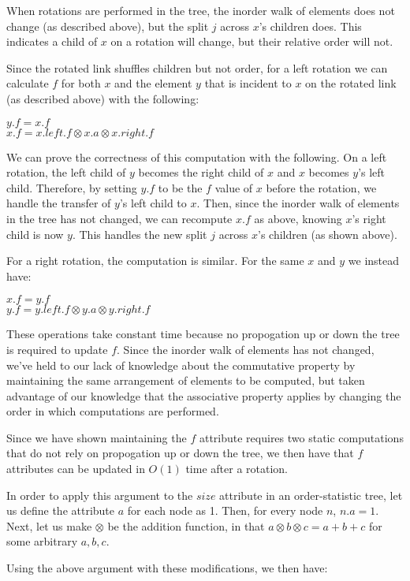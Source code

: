 \documentclass[11pt]{article}
\begin{document}
When rotations are performed in the tree, the inorder walk of elements does not change (as described above), but the split $j$ across $x$'s children does. This indicates a child of $x$ on a rotation will change, but their relative order will not.

Since the rotated link shuffles children but not order, for a left rotation we can calculate $f$ for both $x$ and the element $y$ that is incident to $x$ on the rotated link (as described above) with the following:

$y.f = x.f$\\
$x.f = x.left.f \otimes x.a \otimes x.right.f$

We can prove the correctness of this computation with the following. On a left rotation, the left child of $y$ becomes the right child of $x$ and $x$ becomes $y$'s left child. Therefore, by setting $y.f$ to be the $f$ value of $x$ before the rotation, we handle the transfer of $y$'s left child to $x$. Then, since the inorder walk of elements in the tree has not changed, we can recompute $x.f$ as above, knowing $x$'s right child is now $y$. This handles the new split $j$ across $x$'s children (as shown above).

For a right rotation, the computation is similar. For the same $x$ and $y$ we instead have:

$x.f = y.f$\\
$y.f = y.left.f \otimes y.a \otimes y.right.f$

These operations take constant time because no propogation up or down the tree is required to update $f$. Since the inorder walk of elements has not changed, we've held to our lack of knowledge about the commutative property by maintaining the same arrangement of elements to be computed, but taken advantage of our knowledge that the associative property applies by changing the order in which computations are performed.

Since we have shown maintaining the $f$ attribute requires two static computations that do not rely on propogation up or down the tree, we then have that $f$ attributes can be updated in $O(1)$ time after a rotation.

In order to apply this argument to the $size$ attribute in an order-statistic tree, let us define the attribute $a$ for each node as 1. Then, for every node $n$, $n.a = 1$. Next, let us make $\otimes$ be the addition function, in that $a \otimes b \otimes c = a + b + c$ for some arbitrary $a,b,c$.

Using the above argument with these modifications, we then have:
\end{document}
